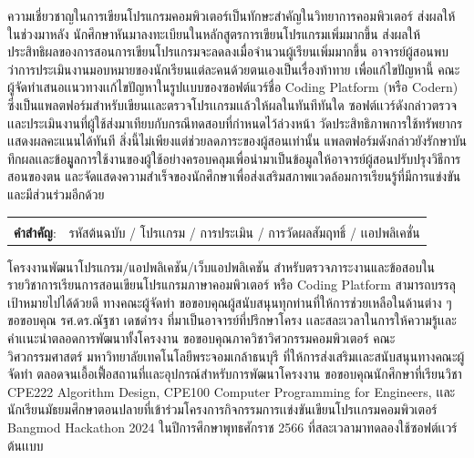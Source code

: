 \documentclass[12pt,oneside,openright,a4paper]{cpe-thai-project}
\begin{document}
\thaiabstract
ความเชี่ยวชาญในการเขียนโปรแกรมคอมพิวเตอร์เป็นทักษะสำคัญในวิทยาการคอมพิวเตอร์ ส่งผลให้ในช่วงมาหลัง นักศึกษาหันมาลงทะเบียนในหลักสูตรการเขียนโปรแกรมเพิ่มมากขึ้น ส่งผลให้ประสิทธิผลของการสอนการเขียนโปรแกรมจะลดลงเมื่อจำนวนผู้เรียนเพิ่มมากขึ้น อาจารย์ผู้สอนพบว่าการประเมินงานมอบหมายของนักเรียนแต่ละคนด้วยตนเองเป็นเรื่องท้าทาย เพื่อแก้ไขปัญหานี้ คณะผู้จัดทำเสนอเเนวทางเเก้ไขปัญหาในรูปเเบบของซอฟต์แวร์ชื่อ Coding Platform (หรือ Codern) ซึ่งเป็นแพลตฟอร์มสำหรับเขียนเเละตรวจโปรเเกรมเเล้วให้ผลในทันทีทันใด ซอฟต์เเวร์ดังกล่าวตรวจเเละประเมินงานที่ผู้ใช้ส่งมาเทียบกับกรณีทดสอบที่กำหนดไว้ล่วงหน้า วัดประสิทธิภาพการใช้ทรัพยากร เเสดงผลคะแนนได้ทันที สิ่งนี้ไม่เพียงแต่ช่วยลดภาระของผู้สอนเท่านั้น แพลตฟอร์มดังกล่าวยังรักษาบันทึกผลเเละข้อมููลการใช้งานของผู้ใช้อย่างครอบคลุมเพื่อนำมาเป็นข้อมูลให้อาจารย์ผู้สอนปรับปรุงวิธีการสอนของตน และจัดแสดงความสำเร็จของนักศึกษาเพื่อส่งเสริมสภาพแวดล้อมการเรียนรู้ที่มีการแข่งขันและมีส่วนร่วมอีกด้วย 

\begin{flushleft}
\begin{tabular*}{\textwidth}{@{}lp{}}
 & \\

\textbf{คำสำคัญ}: & รหัสต้นฉบับ / โปรเเกรม /  การประเมิน / การวัดผลสัมฤทธิ์ / เเอปพลิเคชั่น
\end{tabular*}
\end{flushleft}
\endabstract


\preface
โครงงานพัฒนาโปรแกรม/แอปพลิเคชัน/เว็บแอปพลิเคชัน สำหรับตรวจภาระงานและข้อสอบในรายวิชาการเรียนการสอนเขียนโปรแกรมภาษาคอมพิวเตอร์ หรือ Coding Platform สามารถบรรลุเป้าหมายไปได้ด้วยดี ทางคณะผู้จัดทำ ขอขอบคุณผู้สนับสนุนทุกท่านที่ให้การช่วยเหลือในด้านต่าง ๆ ขอขอบคุณ รศ.ดร.ณัฐชา เดชดำรง ที่มาเป็นอาจารย์ที่ปรึกษาโครง เเละสละเวลาในการให้ความรู้เเละคำเเนะนำตลอดการพัฒนาทั้งโครงงาน ขอขอบคุณภาควิชาวิศวกรรมคอมพิวเตอร์ คณะวิศวกรรมศาสตร์ มหาวิทยาลัยเทคโนโลยีพระจอมเกล้าธนบุรี ที่ให้การส่งเสริมเเละสนับสนุนทางคณะผู้จัดทำ ตลอดจนเอื้อเฟื้อสถานที่เเละอุปกรณ์สำหรับการพัฒนาโครงงาน ขอขอบคุณนักศึกษาที่เรียนวิชา CPE222 Algorithm Design, CPE100 Computer Programming for Engineers, เเละนักเรียนมัธยมศึกษาตอนปลายที่เข้าร่วมโครงการกิจกรรมการเเข่งขันเขียนโปรเเกรมคอมพิวเตอร์ Bangmod Hackathon 2024 ในปีการศึกษาพุทธศักราช 2566 ที่สละเวลามาทดลองใช้ซอฟต์เเวร์ต้นเเบบ
\end{document}

